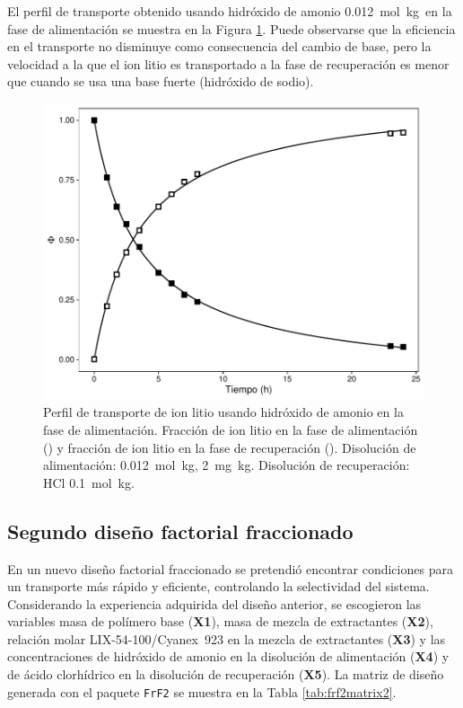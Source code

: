 El perfil de transporte obtenido usando hidróxido de amonio 0.012~mol~kg\mnn\ en la fase de alimentación se muestra en la Figura \ref{fig:amonio1}. Puede observarse que la eficiencia en el transporte no disminuye como consecuencia del cambio de base, pero la velocidad a la que el ion litio es transportado a la fase de recuperación es menor que cuando se usa una base fuerte (hidróxido de sodio).
\begin{figure}[H]
  \centering
  \includegraphics[height=0.388\textwidth]{chap5/figures/g1profile.pdf}
  \caption[Perfil de transporte de ion litio usando hidróxido de amonio en la fase de alimentación.]{Perfil de transporte de ion litio usando hidróxido de amonio en la fase de alimentación. Fracción de ion litio en la fase de alimentación (\protect\squareblck) y fracción de ion litio en la fase de recuperación (\protect\squarewht). Disolución de alimentación:  0.012~mol~kg\mnn,  2~mg~kg\mnn. Disolución de recuperación: HCl 0.1~mol~kg\mnn.}
  \label{fig:amonio1}
\end{figure}


\subsection{Segundo diseño factorial fraccionado}
En un nuevo diseño factorial fraccionado se pretendió encontrar condiciones para un transporte más rápido y eficiente, controlando la selectividad del sistema. Considerando la experiencia adquirida del diseño anterior, se escogieron las variables masa de polímero base (\textbf{X1}), masa de mezcla de extractantes (\textbf{X2}), relación molar LIX-54-100/Cyanex~923 en la mezcla de extractantes (\textbf{X3}) y las concentraciones de hidróxido de amonio en la disolución de alimentación (\textbf{X4}) y de ácido clorhídrico en la disolución de recuperación (\textbf{X5}). La matriz de diseño generada con el paquete \verb|FrF2| \citep{FrF2} se muestra en la Tabla \ref{tab:frf2matrix2}.

